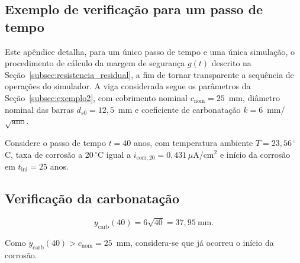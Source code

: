 \renewcommand\theequation{\Alph{section}\arabic{equation}}
\renewcommand\thefigure{\Alph{section}\arabic{figure}}
\renewcommand\thetable{\Alph{section}\arabic{table}}

\begin{appendices}

\renewcommand{\thesection}{Ap\^endice \Alph{section}}
\renewcommand{\thesubsection}{\Alph{section}.\arabic{subsection}}

\section{Exemplo de verifica\c{c}\~ao para um passo de tempo}
\label{app:exemplo_passo}


Este apêndice detalha, para um único passo de tempo e uma única simulação, o procedimento de cálculo da margem de segurança $g(t)$ descrito na Seção~\ref{subsec:resistencia_residual}, a fim de tornar transparente a sequência de operações do simulador. A viga considerada segue os parâmetros da Seção~\ref{subsec:exemplo2}, com cobrimento nominal $c_{\mathrm{nom}} = 25$~mm, diâmetro nominal das barras $d_{s0} = 12{,}5$~mm e coeficiente de carbonatação $k = 6$~mm/$\sqrt{\text{ano}}$.

Considere o passo de tempo $t = 40$ anos, com temperatura ambiente $T = 23{,}56\,^\circ$C, taxa de corrosão a 20\,$^\circ$C igual a $i_{\mathrm{corr},20} = 0{,}431\,\mu$A/cm$^2$ e início da corrosão em $t_{\mathrm{ini}} = 25$ anos.

\subsection{Verifica\c{c}\~ao da carbonata\c{c}\~ao}

\begin{equation}
y_{\mathrm{carb}}(40) = 6\sqrt{40} = 37{,}95~\text{mm}.
\end{equation}

Como $y_{\mathrm{carb}}(40) > c_{\mathrm{nom}} = 25$~mm, considera-se que já ocorreu o início da corrosão.


\end{appendices}
